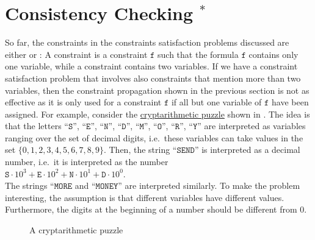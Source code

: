 \section{Consistency Checking \label{sec:consistency}$^*$}
So far, the constraints in the constraints satisfaction problems discussed are either  
or :  A  constraint is a constraint $\texttt{f}$
such that the formula $\texttt{f}$ contains only one variable, while a  constraint
contains two variables.  If we have a constraint satisfaction problem that involves also constraints that
mention more than two variables, then the constraint propagation shown in the previous section is not
as effective as it is only used for a constraint $\texttt{f}$ if all but one variable of $\texttt{f}$ have been assigned.
For example, consider the \href{https://en.wikipedia.org/wiki/Verbal_arithmetic}{cryptarithmetic puzzle} shown
in .  The idea is that the letters 
``$\texttt{S}$'', ``$\texttt{E}$'', ``$\texttt{N}$'', ``$\texttt{D}$'', ``$\texttt{M}$'', ``$\texttt{O}$'', ``$\texttt{R}$'', ``$\texttt{Y}$'' 
are interpreted as variables ranging over the set of decimal digits, i.e.~these variables can take values in
the set $\{0,1,2,3,4,5,6,7,8,9\}$.  Then, the string ``$\texttt{SEND}$'' is interpreted as a decimal number,
i.e.~it is interpreted as the number
\\[0.2cm]
\hspace*{1.3cm}
$\texttt{S} \cdot 10^3 + \texttt{E} \cdot 10^2 + \texttt{N} \cdot 10^1 + \texttt{D} \cdot 10^0$.
\\[0.2cm]
The strings ``$\texttt{MORE}$ and ``$\texttt{MONEY}$'' are interpreted similarly. To make the problem
interesting, the assumption is that different variables have different values.  Furthermore, the
digits at the beginning of a number should be different from $0$.


\begin{figure}[!ht]
\centering
{}

\caption{A cryptarithmetic puzzle}
\label{fig:send-more-money.pdf}
\end{figure}


